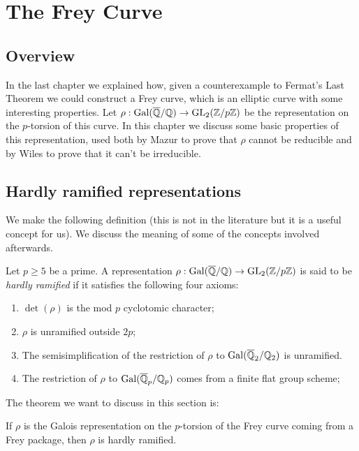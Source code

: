 \chapter{The Frey Curve}

\section{Overview}

In the last chapter we explained how, given a counterexample to Fermat's Last Theorem we could construct a Frey curve, which is an elliptic curve with some interesting properties. Let $\rho:\operatorname{Gal}(\overline{\mathbb{Q}}/\mathbb{Q})\to\operatorname{GL}_2(\mathbb{Z}/p\mathbb{Z})$ be the representation on the $p$-torsion of this curve. In this chapter we discuss some basic properties of this representation, used both by Mazur to prove that $\rho$ cannot be reducible and by Wiles to prove that it can't be irreducible.

\section{Hardly ramified representations}

We make the following definition (this is not in the literature but it is a useful concept for us). We discuss the meaning of some of the concepts involved afterwards.

\begin{definition}\label{hardly_ramified} Let $p\geq5$ be a prime. A representation $\rho: \operatorname{Gal}(\overline{\mathbb{Q}}/\mathbb{Q})\to \operatorname{GL}_2(\mathbb{Z}/p\mathbb{Z})$ is said to be \emph{hardly ramified} if it satisfies the following four axioms:
  \begin{enumerate}
  \item $\det(\rho)$ is the mod $p$ cyclotomic character;
  \item $\rho$ is unramified outside $2p$;
  \item The semisimplification of the restriction of $\rho$ to $\operatorname{Gal}(\overline{\mathbb{Q}}_2/\mathbb{Q}_2)$ is unramified.
  \item The restriction of $\rho$ to $\operatorname{Gal}(\overline{\mathbb{Q}}_p/\mathbb{Q}_p)$ comes from a finite flat group scheme;
  \end{enumerate}
\end{definition}

The theorem we want to discuss in this section is:

\begin{theorem}\label{frey_curve_hardly_ramified} If $\rho$ is the Galois representation on the $p$-torsion of the Frey curve coming from a Frey package, then $\rho$ is hardly ramified.
\end{theorem}
